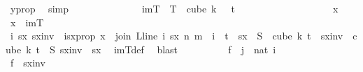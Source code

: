 \begin{isabellebody}
\ y{\isacharunderscore}{\kern0pt}prop\ \isamarkupfalse%
\ simp\isanewline
\ \ \ \ \ \ \isamarkupfalse%
\isanewline
\isanewline
\ \ \ \ \ \ \isamarkupfalse%
\ {\isachardoublequoteopen}imT\ {\isasymsubseteq}\ T\ {\isacharbackquote}{\kern0pt}\ cube\ {\isacharparenleft}{\kern0pt}k\ {\isacharplus}{\kern0pt}\ {}{\isacharparenright}{\kern0pt}\ {\isacharparenleft}{\kern0pt}t\ {\isacharplus}{\kern0pt}\ {}{\isacharparenright}{\kern0pt}{\isachardoublequoteclose}\ \isanewline
\ \ \ \ \ \ \isamarkupfalse%
\isanewline
\ \ \ \ \ \ \ \ \isamarkupfalse%
\ x\ \isamarkupfalse%
\ {\isachardoublequoteopen}x\ {\isasymin}\ imT{\isachardoublequoteclose}\isanewline
\ \ \ \ \ \ \ \ \isamarkupfalse%
\ \isamarkupfalse%
\ i\ sx\ sxinv\ \ isx{\isacharunderscore}{\kern0pt}prop{\isacharcolon}{\kern0pt}\ {\isachardoublequoteopen}x\ {\isacharequal}{\kern0pt}\ join\ {\isacharparenleft}{\kern0pt}L{\isacharunderscore}{\kern0pt}line\ i{\isacharparenright}{\kern0pt}\ sx\ n\ m\ {\isasymand}\ i\ {\isasymin}\ {\isacharbraceleft}{\kern0pt}{\isachardot}{\kern0pt}{\isachardot}{\kern0pt}{\isacharless}{\kern0pt}t{\isacharplus}{\kern0pt}{}{\isacharbraceright}{\kern0pt}\ {\isasymand}\ sx\ {\isasymin}\ S\ {\isacharbackquote}{\kern0pt}\ {\isacharparenleft}{\kern0pt}cube\ k\ {\isacharparenleft}{\kern0pt}t{\isacharplus}{\kern0pt}{}{\isacharparenright}{\kern0pt}{\isacharparenright}{\kern0pt}\ {\isasymand}\ sxinv\ {\isasymin}\ cube\ k\ {\isacharparenleft}{\kern0pt}t{\isacharplus}{\kern0pt}{}{\isacharparenright}{\kern0pt}\ {\isasymand}\ S\ sxinv\ {\isacharequal}{\kern0pt}\ sx{\isachardoublequoteclose}\ \isamarkupfalse%
\ imT{\isacharunderscore}{\kern0pt}def\ \isamarkupfalse%
\ blast\isanewline
\ \ \ \ \ \ \ \ \isamarkupfalse%
\ {\isacharquery}{\kern0pt}f{}\ {\isacharequal}{\kern0pt}\ {\isachardoublequoteopen}{\isacharparenleft}{\kern0pt}{\isasymlambda}j\ {\isasymin}\ {\isacharbraceleft}{\kern0pt}{\isachardot}{\kern0pt}{\isachardot}{\kern0pt}{\isacharless}{\kern0pt}{}{\isacharcolon}{\kern0pt}{\isacharcolon}{\kern0pt}nat{\isacharbraceright}{\kern0pt}{\isachardot}{\kern0pt}\ i{\isacharparenright}{\kern0pt}{\isachardoublequoteclose}\isanewline
\ \ \ \ \ \ \ \ \isamarkupfalse%
\ {\isacharquery}{\kern0pt}f{}\ {\isacharequal}{\kern0pt}\ {\isachardoublequoteopen}sxinv{\isachardoublequoteclose}\isanewline

\end{isabellebody}
